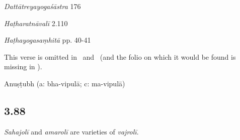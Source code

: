 \begin{ekdosis}
\begin{sources}[hp03_087_1]
\emph{Dattātreyayogaśāstra} 176
\begin{versinnote}
\end{versinnote}
\end{sources}

\begin{testimonia}[hp03_087_1]
\emph{Haṭharatnāvalī} 2.110
\begin{versinnote}
\end{versinnote}

\emph{Haṭhayogasaṃhitā} pp. 40-41
\begin{versinnote}
\end{versinnote}

\end{testimonia}

\begin{philcomm}[hp03_087_1]
This verse is omitted in \alphaTwo\ and \alphaThree\ (and the folio on which it would be found is missing in \alphaOne).
\end{philcomm}

\begin{metre}[hp03_087_1]
Anuṣṭubh (a: bha-vipulā; c: ma-vipulā)
\end{metre}

\subsection*{3.88}
\begin{translation}[hp03_088]
\emph{Sahajolī} and \emph{amarolī} are varieties of \emph{vajrolī}. 
\end{translation}


\end{ekdosis}
